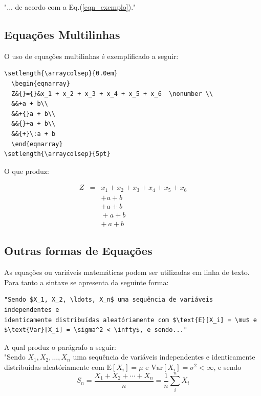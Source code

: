 \documentclass[12pt,A4,A4pt]{article}
\begin{document}
"... de acordo com a Eq.(\ref{eqn_exemplo})."


\subsection{Equações Multilinhas}

O uso de equações multilinhas é exemplificado a seguir:

\begin{verbatim}
\setlength{\arraycolsep}{0.0em}
  \begin{eqnarray}
  Z&{}={}&x_1 + x_2 + x_3 + x_4 + x_5 + x_6  \nonumber \\
  &&+a + b\\
  &&+{}a + b\\
  &&{}+a + b\\
  &&{+}\:a + b
  \end{eqnarray}
\setlength{\arraycolsep}{5pt}
\end{verbatim}

O que produz:

\setlength{\arraycolsep}{0.0em}
\begin{eqnarray}
Z&{}={}&x_1 + x_2 + x_3 + x_4 + x_5 + x_6  \nonumber \\
&&+a + b\\
&&+{}a + b\\
&&{}+a + b\\
&&{+}\:a + b
\end{eqnarray}
\setlength{\arraycolsep}{5pt}

\subsection{Outras formas de Equações}

As equações ou variáveis matemáticas podem ser utilizadas em linha de texto. Para tanto a sintaxe se apresenta da seguinte forma:

\begin{verbatim}
"Sendo $X_1, X_2, \ldots, X_n$ uma sequência de variáveis independentes e
identicamente distribuídas aleatóriamente com $\text{E}[X_i] = \mu$ e
$\text{Var}[X_i] = \sigma^2 < \infty$, e sendo..."
\end{verbatim}

A qual produz o parágrafo a seguir:\\


"Sendo $X_1, X_2, \ldots, X_n$ uma sequência de variáveis independentes e identicamente distribuídas aleatóriamente com $\text{E}[X_i] = \mu$ e $\text{Var}[X_i] = \sigma^2 < \infty$, e sendo
\begin{equation}
S_n = \frac{X_1 + X_2 + \cdots + X_n}{n}
      = \frac{1}{n}\sum_{i}^{n} X_i
\label{eq:refname1}
\end{equation}
\end{document}
